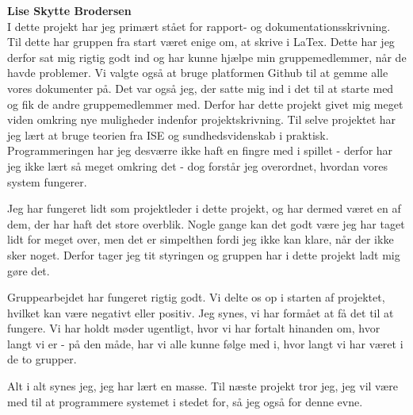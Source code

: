 \textbf{Lise Skytte Brodersen}\\
I dette projekt har jeg primært stået for rapport- og dokumentationsskrivning. Til dette har gruppen fra start været enige om, at skrive i LaTex. Dette har jeg derfor sat mig rigtig godt ind og har kunne hjælpe min gruppemedlemmer, når de havde problemer. Vi valgte også at bruge platformen Github til at gemme alle vores dokumenter på. Det var også jeg, der satte mig ind i det til at starte med og fik de andre gruppemedlemmer med. Derfor har dette projekt givet mig meget viden omkring nye muligheder indenfor projektskrivning. Til selve projektet har jeg lært at bruge teorien fra ISE og sundhedsvidenskab i praktisk. Programmeringen har jeg desværre ikke haft en fingre med i spillet - derfor har jeg ikke lært så meget omkring det - dog forstår jeg overordnet, hvordan vores system fungerer.

Jeg har fungeret lidt som projektleder i dette projekt, og har dermed været en af  dem, der har haft det store overblik. Nogle gange kan det godt være jeg har taget lidt for meget over, men det er simpelthen fordi jeg ikke kan klare, når der ikke sker noget. Derfor tager jeg tit styringen og gruppen har i dette projekt ladt mig gøre det.

Gruppearbejdet har fungeret rigtig godt. Vi delte os op i starten af projektet, hvilket kan være negativt eller positiv. Jeg synes, vi har formået at få det til at fungere. Vi har holdt møder ugentligt, hvor vi har fortalt hinanden om, hvor langt vi er - på den måde, har vi alle kunne følge med i, hvor langt vi har været i de to grupper.

Alt i alt synes jeg, jeg har lært en masse. Til næste projekt tror jeg, jeg vil være med til at programmere systemet i stedet for, så jeg også for denne evne.

